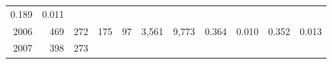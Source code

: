 \documentclass[]{article}
\begin{document}
\begin{longtable}[]{@{}rrrrrrrrrrr@{}}
\begin{minipage}[t]{0.10\columnwidth}
0.189\strut
\end{minipage} & \begin{minipage}[t]{0.04\columnwidth}\raggedleft\strut
0.011\strut
\end{minipage}\tabularnewline
\begin{minipage}[t]{0.06\columnwidth}\raggedleft\strut
2006\strut
\end{minipage} & \begin{minipage}[t]{0.07\columnwidth}\raggedleft\strut
469\strut
\end{minipage} & \begin{minipage}[t]{0.07\columnwidth}\raggedleft\strut
272\strut
\end{minipage} & \begin{minipage}[t]{0.07\columnwidth}\raggedleft\strut
175\strut
\end{minipage} & \begin{minipage}[t]{0.07\columnwidth}\raggedleft\strut
97\strut
\end{minipage} & \begin{minipage}[t]{0.07\columnwidth}\raggedleft\strut
3,561\strut
\end{minipage} & \begin{minipage}[t]{0.05\columnwidth}\raggedleft\strut
9,773\strut
\end{minipage} & \begin{minipage}[t]{0.09\columnwidth}\raggedleft\strut
0.364\strut
\end{minipage} & \begin{minipage}[t]{0.05\columnwidth}\raggedleft\strut
0.010\strut
\end{minipage} & \begin{minipage}[t]{0.10\columnwidth}\raggedleft\strut
0.352\strut
\end{minipage} & \begin{minipage}[t]{0.04\columnwidth}\raggedleft\strut
0.013\strut
\end{minipage}\tabularnewline
\begin{minipage}[t]{0.06\columnwidth}\raggedleft\strut
2007\strut
\end{minipage} & \begin{minipage}[t]{0.07\columnwidth}\raggedleft\strut
398\strut
\end{minipage} & \begin{minipage}[t]{0.07\columnwidth}\raggedleft\strut
273\strut
\end{minipage} & \begin{minipage}[t]{0.07\columnwidth}\raggedleft\strut

\end{minipage}
\end{longtable}
\end{document}
